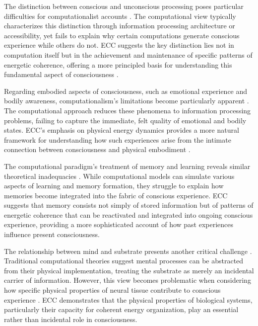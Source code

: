 The distinction between conscious and unconscious processing poses particular difficulties for computationalist accounts \cite{fodor2000mind}. The computational view typically characterizes this distinction through information processing architecture or accessibility, yet fails to explain why certain computations generate conscious experience while others do not. ECC suggests the key distinction lies not in computation itself but in the achievement and maintenance of specific patterns of energetic coherence, offering a more principled basis for understanding this fundamental aspect of consciousness \cite{dreyfus1972what}.

Regarding embodied aspects of consciousness, such as emotional experience and bodily awareness, computationalism's limitations become particularly apparent \cite{smith2019promise}. The computational approach reduces these phenomena to information processing problems, failing to capture the immediate, felt quality of emotional and bodily states. ECC's emphasis on physical energy dynamics provides a more natural framework for understanding how such experiences arise from the intimate connection between consciousness and physical embodiment \cite{piccinini2015physical}.

The computational paradigm's treatment of memory and learning reveals similar theoretical inadequacies \cite{harnad1990symbol}. While computational models can simulate various aspects of learning and memory formation, they struggle to explain how memories become integrated into the fabric of conscious experience. ECC suggests that memory consists not simply of stored information but of patterns of energetic coherence that can be reactivated and integrated into ongoing conscious experience, providing a more sophisticated account of how past experiences influence present consciousness.

The relationship between mind and substrate presents another critical challenge \cite{dreyfus1972what}. Traditional computational theories suggest mental processes can be abstracted from their physical implementation, treating the substrate as merely an incidental carrier of information. However, this view becomes problematic when considering how specific physical properties of neural tissue contribute to conscious experience \cite{searle1980minds}. ECC demonstrates that the physical properties of biological systems, particularly their capacity for coherent energy organization, play an essential rather than incidental role in consciousness.

